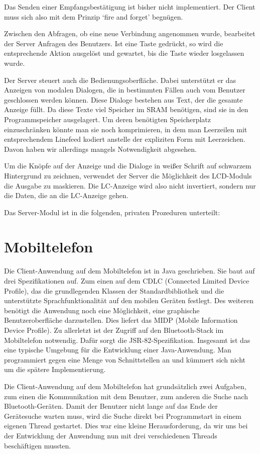 \documentclass[ngerman]{article}
\begin{document}
Das Senden einer Empfangsbestätigung ist bisher nicht implementiert. Der
Client muss sich also mit dem Prinzip `fire and forget' begnügen.

Zwischen den Abfragen, ob eine neue Verbindung angenommen wurde, bearbeitet
der Server Anfragen des Benutzers. Ist eine Taste gedrückt, so wird die
entsprechende Aktion ausgelöst und gewartet, bis die Taste wieder losgelassen
wurde.

Der Server steuert auch die Bedienungsoberfläche. Dabei unterstützt er das
Anzeigen von modalen Dialogen, die in bestimmten Fällen auch vom Benutzer
geschlossen werden können. Diese Dialoge bestehen aus Text, der die gesamte
Anzeige füllt. Da diese Texte viel Speicher im SRAM benötigen, sind sie in
den Programmspeicher ausgelagert. Um deren benötigten Speicherplatz 
ein\-zu\-schrän\-ken könnte man sie noch komprimieren, in dem man Leerzeilen mit
entsprechendem Linefeed kodiert anstelle der expliziten Form mit
Leerzeichen. Davon haben wir allerdings mangels Notwendigkeit abgesehen.

Um die Knöpfe auf der Anzeige und die Dialoge in weißer Schrift auf
schwarzem Hintergrund zu zeichnen, verwendet der Server die Möglichkeit
des LCD-Moduls die Ausgabe zu maskieren. Die LC-Anzeige wird also nicht
invertiert, sondern nur die Daten, die an die LC-Anzeige gehen.

Das Server-Modul ist in die folgenden, privaten Prozeduren unterteilt:



\section{Mobiltelefon}

Die Client-Anwendung auf dem Mobiltelefon ist in Java geschrieben. Sie baut
auf drei Spezifikationen auf. Zum einen auf dem CDLC (Connected Limited Device Profile), 
das die grundlegenden Klassen der Standardbibliothek und die unterstützte
Sprachfunktionalität auf den mobilen Geräten festlegt. Des weiteren benötigt
die Anwendung noch eine Möglichkeit, eine graphische Benutzeroberfläche 
darzustellen. Dies liefert das MIDP (Mobile Information Device Profile). Zu
allerletzt ist der Zugriff auf den Bluetooth-Stack im Mobiltelefon notwendig.
Dafür sorgt die JSR-82-Spezifikation. Insgesamt ist das eine typische Umgebung
für die Entwicklung einer Java-Anwendung. Man programmiert gegen eine Menge
von Schnittstellen an und kümmert sich nicht um die spätere Implementierung.

Die Client-Anwendung auf dem Mobiltelefon hat grundsätzlich zwei Aufgaben, zum
einen die Kommunikation mit dem Benutzer, zum anderen die Suche nach 
Bluetooth-Geräten. Damit der Benutzer nicht lange auf das Ende der Gerätesuche
warten muss, wird die Suche direkt bei Programmstart in einem eigenen Thread
gestartet. Dies war eine kleine Herausforderung, da wir uns bei der
Entwicklung der Anwendung nun mit drei verschiedenen Threads beschäftigen mussten.
\end{document}
